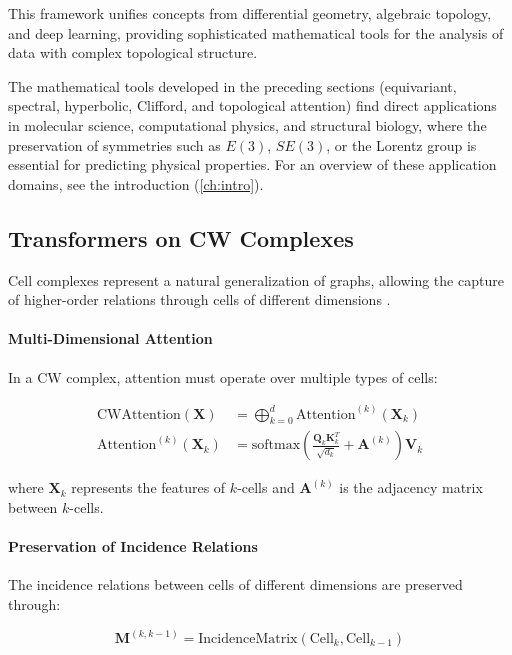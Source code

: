 This framework unifies concepts from differential geometry, algebraic topology, and deep learning, providing sophisticated mathematical tools for the analysis of data with complex topological structure.

The mathematical tools developed in the preceding sections (equivariant, spectral, hyperbolic, Clifford, and topological attention) find direct applications in molecular science, computational physics, and structural biology, where the preservation of symmetries such as $E(3)$, $SE(3)$, or the Lorentz group is essential for predicting physical properties. For an overview of these application domains, see the introduction (\autoref{ch:intro}).

\subsection[Transformers on CW Complexes]{\glspl{Transformer} on CW Complexes}

Cell complexes represent a natural generalization of graphs, allowing the capture of higher-order relations through cells of different dimensions \citep{bodnar2021cell}.

\paragraph{Multi-Dimensional Attention}

In a CW complex, attention must operate over multiple types of cells:

\begin{align}
\text{CWAttention}(\mathbf{X}) &= \bigoplus_{k=0}^{d} \text{Attention}^{(k)}(\mathbf{X}_k) \label{eq:cw_attention} \\
\text{Attention}^{(k)}(\mathbf{X}_k) &= \text{softmax}\left(\frac{\mathbf{Q}_k \mathbf{K}_k^T}{\sqrt{d_k}} + \mathbf{A}^{(k)}\right) \mathbf{V}_k
\end{align}

where $\mathbf{X}_k$ represents the features of $k$-cells and $\mathbf{A}^{(k)}$ is the adjacency matrix between $k$-cells.

\paragraph{Preservation of Incidence Relations}

The incidence relations between cells of different dimensions are preserved through:

\begin{equation}
\mathbf{M}^{(k,k-1)} = \text{IncidenceMatrix}(\text{Cell}_k, \text{Cell}_{k-1})
\label{eq:incidence_preservation}
\end{equation}

